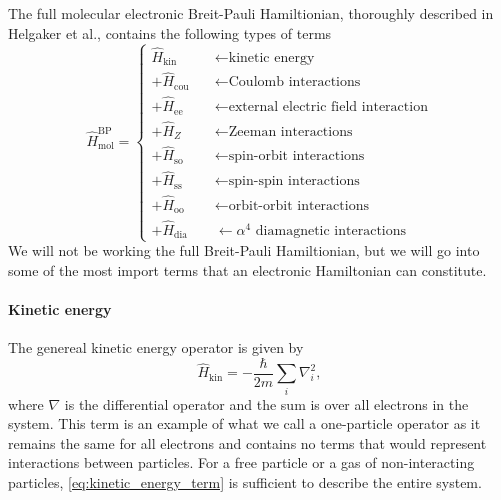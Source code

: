     The full  molecular electronic Breit-Pauli Hamiltionian, thoroughly described in 
    Helgaker et al.\cite{helgaker2012recent}, contains the following types of terms
    \begin{equation}
        \label{eq:breit_pauli_hamiltonian}
        \hat{H}^{\text{BP}}_{\text{mol}}
        = \begin{cases}
            \hat{H}_{\text{kin}} \quad &\leftarrow \text{kinetic energy} \\
            + \hat{H}_{\text{cou}} \quad &\leftarrow \text{Coulomb interactions} \\
            + \hat{H}_{\text{ee}} \quad &\leftarrow \text{external electric field interaction} \\
            + \hat{H}_Z \quad &\leftarrow \text{Zeeman interactions} \\
            + \hat{H}_{\text{so}} &\leftarrow \text{spin-orbit interactions} \\
            + \hat{H}_{\text{ss}} &\leftarrow \text{spin-spin interactions} \\
            + \hat{H}_{\text{oo}} &\leftarrow \text{orbit-orbit interactions} \\
            + \hat{H}_{\text{dia}} &\leftarrow \alpha^4 \text{ diamagnetic interactions}
        \end{cases}
    \end{equation}
    We will not be working the full Breit-Pauli Hamiltionian, but we will go into some of the
    most import terms that an electronic Hamiltonian can constitute. 
    
    \paragraph{Kinetic energy}

    The genereal kinetic energy operator is given by
    \begin{equation}
        \label{eq:kinetic_energy_term}
        \hat{H}_{\text{kin}}
            = - \frac{\hbar}{2m}\sum_i \nabla^2_i,
    \end{equation}
    where $\nabla$ is the differential operator and the sum is over all electrons in 
    the system. This term is an example of what we call a one-particle operator as
    it remains the 
    same for all electrons and contains no terms that would represent interactions 
    between particles. For a free particle or a gas of non-interacting particles, 
    \autoref{eq:kinetic_energy_term} is sufficient to describe the entire system. 

